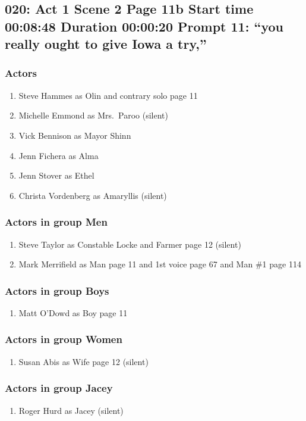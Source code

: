 \subsection{020: Act 1 Scene 2 Page 11b Start time 00:08:48 Duration 00:00:20 Prompt 11: ``you really ought to give Iowa a try,''}

\subsubsection{Actors}
\begin{enumerate}
\item Steve Hammes as Olin and contrary solo page 11
\item Michelle Emmond as Mrs.~Paroo (silent)
\item Vick Bennison as Mayor Shinn
\item Jenn Fichera as Alma
\item Jenn Stover as Ethel
\item Christa Vordenberg as Amaryllis (silent)
\end{enumerate}
\subsubsection{Actors in group Men}
\begin{enumerate}
\item Steve Taylor as Constable Locke and Farmer page 12 (silent)
\item Mark Merrifield as Man page 11 and 1st voice page 67 and Man \#1 page 114
\end{enumerate}
\subsubsection{Actors in group Boys}
\begin{enumerate}
\item Matt O'Dowd as Boy page 11
\end{enumerate}
\subsubsection{Actors in group Women}
\begin{enumerate}
\item Susan Abis as Wife page 12 (silent)
\end{enumerate}
\subsubsection{Actors in group Jacey}
\begin{enumerate}
\item Roger Hurd as Jacey (silent)
\end{enumerate}

